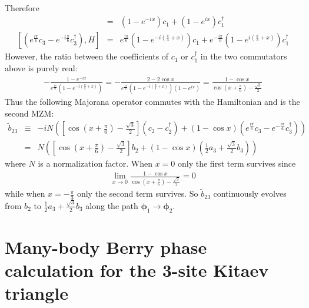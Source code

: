 \documentclass[aps,prb,showpacs,amsmath,amssymb,superscriptaddress]{revtex4-2}
\begin{document}
Therefore
\begin{eqnarray}
	[c_2 - c_2^\dag, H] &=& (1-e^{-ix})c_1 + (1-e^{ix})c_1^\dag\\\nonumber
	[\left( e^{\frac{i\pi}{6}} c_3 - e^{-i\frac{\pi}{6}} c_3^\dag \right), H] & = &  e^{\frac{i\pi}{6}} (1-e^{-i\left(\frac{\pi}{3} + x\right)})c_1 + e^{-\frac{i\pi}{6}}( 1- e^{i\left(\frac{\pi}{3} + x\right)})c_1^\dag
\end{eqnarray}
However, the ratio between the coefficients of $c_1$ or $c_1^\dag$ in the two commutators above is purely real:
\begin{eqnarray}
-\frac{1-e^{-ix}}{e^{\frac{i\pi}{6}} (1-e^{-i\left(\frac{\pi}{3} + x\right)})} = - \frac{2-2\cos x}{e^{\frac{i\pi}{6}} (1-e^{-i\left(\frac{\pi}{3} + x\right)})(1-e^{ix})} = \frac{1-\cos x}{\cos\left( x+ \frac{\pi}{6}\right)-\frac{\sqrt{3}}{2}}
\end{eqnarray}
Thus the following Majorana operator commutes with the Hamiltonian and is the second MZM:
\begin{eqnarray}
	\tilde{b}_{23} &\equiv& -iN\left(\left[\cos\left( x+ \frac{\pi}{6}\right)-\frac{\sqrt{3}}{2}\right](c_2 - c_2^\dag) + (1-\cos x) \left( e^{\frac{i\pi}{6}} c_3 -e^{-\frac{i\pi}{6}} c_3^\dag\right)\right)\\\nonumber
	&=& N\left(\left[\cos\left( x+ \frac{\pi}{6}\right)-\frac{\sqrt{3}}{2}\right]b_2 + (1-\cos x)\left( \frac{1}{2} a_3 + \frac{\sqrt{3}}{2} b_3\right)\right)
\end{eqnarray}
where $N$ is a normalization factor. When $x=0$ only the first term survives since
\begin{eqnarray}
\lim_{x\rightarrow 0} \frac{1-\cos x}{\cos\left( x+ \frac{\pi}{6}\right)-\frac{\sqrt{3}}{2}} = 0
\end{eqnarray}
while when $x = -\frac{\pi}{3}$ only the second term survives. So $\tilde{b}_{23}$ continuously evolves from $b_2$ to $\frac{1}{2} a_3 + \frac{\sqrt{3}}{2} b_3$ along the path $\boldsymbol{\phi}_1\rightarrow \boldsymbol{\phi}_2$.

\section{Many-body Berry phase calculation for the 3-site Kitaev triangle}
\end{document}
